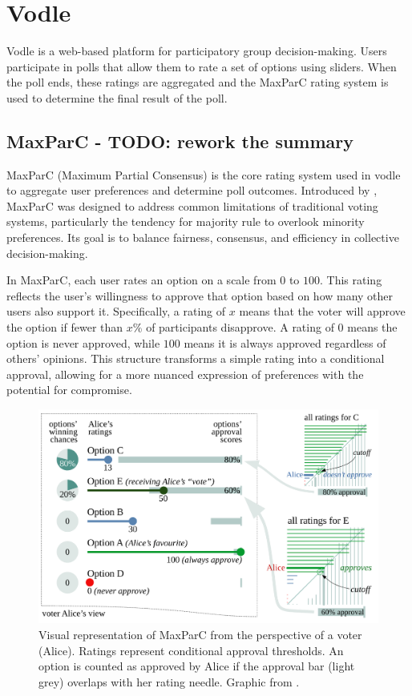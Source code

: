 \section{Vodle}
Vodle is a web-based platform for participatory group decision-making. Users participate in polls that allow them to rate a set of options using sliders. When the poll ends, these ratings are aggregated and the MaxParC rating system is used to determine the final result of the poll.

\subsection{MaxParC - TODO: rework the summary}
MaxParC (Maximum Partial Consensus) is the core rating system used in vodle to aggregate user preferences and determine poll outcomes. Introduced by \cite{heitzig_fair_2024}, MaxParC was designed to address common limitations of traditional voting systems, particularly the tendency for majority rule to overlook minority preferences. Its goal is to balance fairness, consensus, and efficiency in collective decision-making.

In MaxParC, each user rates an option on a scale from $0$ to $100$. This rating reflects the user's willingness to approve that option based on how many other users also support it. Specifically, a rating of $x$ means that the voter will approve the option if fewer than $x\%$ of participants disapprove. A rating of $0$ means the option is never approved, while $100$ means it is always approved regardless of others' opinions. This structure transforms a simple rating into a conditional approval, allowing for a more nuanced expression of preferences with the potential for compromise.

\begin{figure}[H]
  \centering
  \includegraphics[width=0.8\linewidth]{../common/maxparc.png}
  \caption{Visual representation of MaxParC from the perspective of a voter (Alice). Ratings represent conditional approval thresholds. An option is counted as approved by Alice if the approval bar (light grey) overlaps with her rating needle. Graphic from \cite{heitzig_fair_2024}.}
\end{figure}

